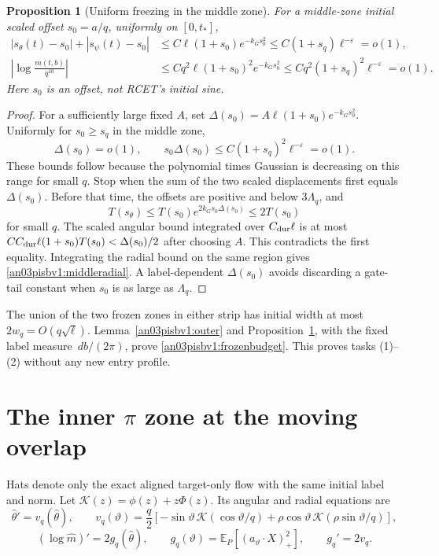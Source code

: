 \documentclass[11pt]{article}
\numberwithin{equation}{section}
\newtheorem{proposition}[theorem]{Proposition}
\theoremstyle{remark}\newtheorem{remark}[theorem]{Remark}
\newcommand{\E}{\mathbb E}
\newcommand{\dd}{\,d}
\newcommand{\Kh}{\mathcal K}
\begin{document}
\begin{proposition}[Uniform freezing in the middle zone]
\label{an03pisbv1:middle}
For a middle-zone initial scaled offset $s_0=a/q$, uniformly on
$[0,t_*]$,
\begin{align}
 |s_\theta(t)-s_0|+|s_\psi(t)-s_0|
 &\le C\ell(1+s_0)e^{-k_Gs_0^2}
 \le C(1+s_q)\ell^{-\varepsilon}=o(1),             \label{an03pisbv1:travel}\\
 \left|\log\frac{m(t,b)}{q^{10}}\right|
 &\le Cq^2\ell(1+s_0)^2e^{-k_Gs_0^2}
 \le Cq^2(1+s_q)^2\ell^{-\varepsilon}=o(1).
                                                        \label{an03pisbv1:middleradial}
\end{align}
Here $s_0$ is an offset, not RCET's initial sine.
\end{proposition}
\begin{proof}
For a sufficiently large fixed $A$, set
$\Delta(s_0)=A\ell(1+s_0)e^{-k_Gs_0^2}$.
Uniformly for $s_0\ge s_q$ in the middle zone,
\[
 \Delta(s_0)=o(1),\qquad
 s_0\Delta(s_0)\le C(1+s_q)^2\ell^{-\varepsilon}=o(1).
\]
These bounds follow because the polynomial times Gaussian is
decreasing on this range for small $q$.
Stop when the sum of the two scaled displacements first equals
$\Delta(s_0)$. Before that time, the offsets are positive and below
$3\Lambda_q$, and
\[
 T(s_\theta)\le T(s_0)e^{2k_Gs_0\Delta(s_0)}
                      \le 2T(s_0)
\]
for small $q$. The scaled angular bound integrated over
$C_{\rm dur}\ell$ is at most
$C C_{\rm dur}\ell(1+s_0)T(s_0)<\Delta(s_0)/2$
after choosing $A$. This contradicts the first equality.
Integrating the radial bound on the same region gives
\eqref{an03pisbv1:middleradial}.
A label-dependent $\Delta(s_0)$ avoids discarding a gate-tail
constant when $s_0$ is as large as $\Lambda_q$.
\end{proof}

The union of the two frozen zones in either strip has initial width
at most $2w_q=O(q\sqrt\ell)$. Lemma~\ref{an03pisbv1:outer} and
Proposition~\ref{an03pisbv1:middle}, with the fixed label measure
$\dd b/(2\pi)$, prove \eqref{an03pisbv1:frozenbudget}.
This proves tasks (1)--(2) without any new entry profile.

\section{The inner \texorpdfstring{$\pi$}{pi} zone at the moving overlap}
Hats denote only the exact aligned target-only flow with the same
initial label and norm. Let $\Kh(z)=\phi(z)+z\Phi(z)$.
Its angular and radial equations are
\[
 \widehat\theta'=v_q(\widehat\theta),\qquad
 v_q(\vartheta)=\frac q2[-\sin\vartheta\,\Kh(\cos\vartheta/q)
       +\rho\cos\vartheta\,\Kh(\rho\sin\vartheta/q)],
\]
\[
 (\log\widehat m)'=2g_q(\widehat\theta),\qquad
 g_q(\vartheta)=\E_P[(a_\vartheta\cdot X)_+^2],\qquad
 g_q'=2v_q .
\]
\end{document}
